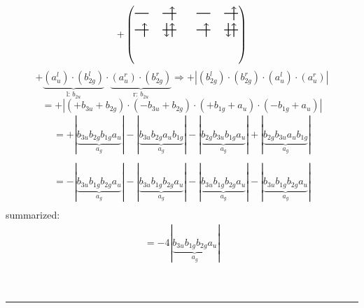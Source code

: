 \documentclass{article}
\begin{document}
\[+\left(\begin{tikzpicture}
    \draw[thick] (0,0) -- (0.5,0); %
    \draw[thick] (1,0) -- (1.5,0); %
    \draw[thick] (0,-0.6) -- (0.5,-0.6); %
    \draw[thick] (1,-0.6) -- (1.5,-0.6); %
\draw[->, thick] (1.35, -0.25) -- (1.35, 0.25); 
\draw[-> , thick] (0.35, -0.85) -- (0.35, -0.35); 
 \draw[-> , thick] (1.35, -0.85) -- (1.35, -0.35); 
\draw[<- , thick] (1.15, -0.85) -- (1.15, -0.35); 
\end{tikzpicture}\qquad \begin{tikzpicture}
    \draw[thick] (0,0) -- (0.5,0); %
    \draw[thick] (1,0) -- (1.5,0); %
    \draw[thick] (0,-0.6) -- (0.5,-0.6); %
    \draw[thick] (1,-0.6) -- (1.5,-0.6); %
\draw[->, thick] (1.35, -0.25) -- (1.35, 0.25); 
\draw[-> , thick] (0.35, -0.85) -- (0.35, -0.35); 
 \draw[-> , thick] (1.35, -0.85) -- (1.35, -0.35); 
\draw[<- , thick] (1.15, -0.85) -- (1.15, -0.35); 
\end{tikzpicture}\right)\]$$+ \underbrace{(a_{u}^{l})\cdot (b_{2g}^{l})}_{\text{l: }b_{2u}}\cdot \underbrace{(a_{u}^{r})\cdot (b_{2g}^{r})}_{\text{r: }b_{2u}}\Rightarrow +\left|(b_{2g}^{l}) \cdot (b_{2g}^{r}) \cdot (a_{u}^{l}) \cdot (a_{u}^{r})\right|$$$$=+\left|(+b_{3u}+b_{2g}) \cdot (-b_{3u}+b_{2g}) \cdot (+b_{1g}+a_{u}) \cdot (-b_{1g}+a_{u})\right|$$\begin{multline*}
=+\left|\underbrace{b_{3u} b_{2g} b_{1g} a_{u}}_{a_{g}}\right|-\left|\underbrace{b_{3u} b_{2g} a_{u} b_{1g}}_{a_{g}}\right|-\left|\underbrace{b_{2g} b_{3u} b_{1g} a_{u}}_{a_{g}}\right|+\left|\underbrace{b_{2g} b_{3u} a_{u} b_{1g}}_{a_{g}}\right|\\
\end{multline*}\begin{multline*}
=-\left|\underbrace{b_{3u} b_{1g} b_{2g} a_{u}}_{a_{g}}\right|-\left|\underbrace{b_{3u} b_{1g} b_{2g} a_{u}}_{a_{g}}\right|-\left|\underbrace{b_{3u} b_{1g} b_{2g} a_{u}}_{a_{g}}\right|-\left|\underbrace{b_{3u} b_{1g} b_{2g} a_{u}}_{a_{g}}\right|\\
\end{multline*}summarized:\begin{multline*}
=-4\left|\underbrace{b_{3u} b_{1g} b_{2g} a_{u}}_{a_{g}}\right|
\end{multline*}\\ \\
\hrule\newpage 
\end{document}
